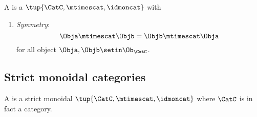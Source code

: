 \begin{ctdefinition}
    \label{def:commutative-strict-monoidal}
    A  is a   $\tup{\CatC, \mtimescat, \idmoncat}$ with

    \condit

    \begin{enumerate}
        \item \emph{Symmetry}:
              \begin{equation}
                  \Obja \mtimescat \Objb = \Objb \mtimescat \Obja
              \end{equation}
              for all object $\Obja, \Objb \setin \Ob_\CatC$.
    \end{enumerate}
\end{ctdefinition}


\subsection{Strict monoidal categories}

\begin{ctdefinition}
    \label{def:strict-monoidal-category}
    A  is a strict monoidal  $\tup{\CatC, \mtimescat, \idmoncat}$ where $\CatC$ is in fact a category.
\end{ctdefinition}

